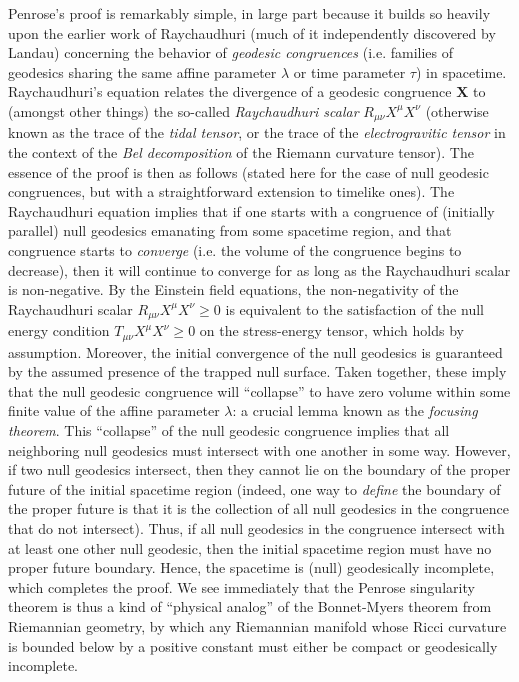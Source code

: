 \documentclass{article}
\begin{document}
Penrose's proof is remarkably simple, in large part because it builds so heavily upon the earlier work of Raychaudhuri\cite{raychaudhuri} (much of it independently discovered by Landau\cite{hawking2}) concerning the behavior of \textit{geodesic congruences} (i.e. families of geodesics sharing the same affine parameter ${\lambda}$ or time parameter ${\tau}$) in spacetime. Raychaudhuri's equation relates the divergence of a geodesic congruence ${\mathbf{X}}$ to (amongst other things) the so-called \textit{Raychaudhuri scalar} ${R_{\mu \nu} X^{\mu} X^{\nu}}$ (otherwise known as the trace of the \textit{tidal tensor}, or the trace of the \textit{electrogravitic tensor} in the context of the \textit{Bel decomposition} of the Riemann curvature tensor\cite{matte}\cite{bel}). The essence of the proof is then as follows (stated here for the case of null geodesic congruences, but with a straightforward extension to timelike ones). The Raychaudhuri equation implies that if one starts with a congruence of (initially parallel) null geodesics emanating from some spacetime region, and that congruence starts to \textit{converge} (i.e. the volume of the congruence begins to decrease), then it will continue to converge for as long as the Raychaudhuri scalar is non-negative. By the Einstein field equations, the non-negativity of the Raychaudhuri scalar ${R_{\mu \nu} X^{\mu} X^{\nu} \geq 0}$ is equivalent to the satisfaction of the null energy condition ${T_{\mu \nu} X^{\mu} X^{\nu} \geq 0}$ on the stress-energy tensor, which holds by assumption. Moreover, the initial convergence of the null geodesics is guaranteed by the assumed presence of the trapped null surface. Taken together, these imply that the null geodesic congruence will ``collapse'' to have zero volume within some finite value of the affine parameter ${\lambda}$: a crucial lemma known as the \textit{focusing theorem}. This ``collapse'' of the null geodesic congruence implies that all neighboring null geodesics must intersect with one another in some way. However, if two null geodesics intersect, then they cannot lie on the boundary of the proper future of the initial spacetime region (indeed, one way to \textit{define} the boundary of the proper future is that it is the collection of all null geodesics in the congruence that do not intersect). Thus, if all null geodesics in the congruence intersect with at least one other null geodesic, then the initial spacetime region must have no proper future boundary. Hence, the spacetime is (null) geodesically incomplete, which completes the proof. We see immediately that the Penrose singularity theorem is thus a kind of ``physical analog'' of the Bonnet-Myers theorem from Riemannian geometry\cite{myers}, by which any Riemannian manifold whose Ricci curvature is bounded below by a positive constant must either be compact or geodesically incomplete.
\end{document}
